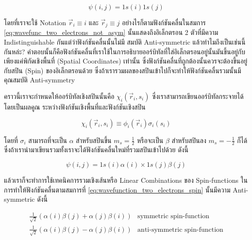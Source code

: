 \begin{equation}
    \label{eq:wavefunc_two_electrons_not_asym}
    \psi(i, j) = 1 s(i) 1 s(j)
\end{equation}

\noindent โดยที่เราจะใช้ Notation $\vec{r}_i \equiv i$ และ $\vec{r}_j \equiv j$ อย่างไรก็ตามฟังก์ชันคลื่นในสมการ
\eqref{eq:wavefunc_two_electrons_not_asym} นั้นแสดงถึงอิเล็กตรอน 2 ตัวที่มีความ Indistinguishable กันแต่ว่าฟังก์ชันคลื่นนั้นไม่มี%
สมบัติ Anti-symmetric แล้วทำไมถึงเป็นเช่นนี้กันหล่ะ? คำตอบนั้นก็คือฟังก์ชันคลื่นที่เราใช้ในการอธิบายออร์บิทัลที่ใส่อิเล็กตรอนอยู่นั้นมันขึ้นอยู่กับ%
เพียงแค่พิกัดเชิงพื้นที่ (Spatial Coordinates) เท่านั้น ซึ่งฟังก์ชันคลื่นที่ถูกต้องนั้นควรจะต้องขึ้นอยู่กับสปิน (Spin) ของอิเล็กตรอนด้วย%
ซึ่งถ้าเรารวมผลของสปินเข้าไปก็จะทำให้ฟังก์ชันคลื่นรวมนั้นมีคุณสมบัติ Anti-symmetry

คราวนี้เราจะกำหนดให้ออร์บิทัลเชิงสปินนั้นคือ $\chi_i\left(\vec{r}_i, s_i\right)$ ซึ่งเราสามารถเขียนออร์บิทัลกระจายได้โดยเป็นผลคูณ%
ระหว่างฟังก์ชันเชิงพื้นที่และฟังก์ชันเชิงสปิน

\begin{equation}
    \chi_i\left(\vec{r}_i, s_i\right)
    \equiv
    \phi_i\left(\vec{r}_i\right) \sigma_i\left(s_i\right)
\end{equation}

\noindent โดยที่ $\sigma_i$ สามารถที่จะเป็น $\alpha$ สำหรับสปินขึ้น $m_s=\frac{1}{2}$ หรือจะเป็น $\beta$ สำหรับสปินลง
$m_s=-\frac{1}{2}$ ก็ได้ ซึ่งถ้าเรานำมาเขียนรวมทั้งเราจะได้ฟังก์ชันคลื่นใหม่ที่รวมสปินเข้าไปด้วย ดังนี้

\begin{equation}
    \label{eq:wavefunction_two_electrons_spin}
    \psi(i, j)
    =
    1 s(i) \alpha(i) \times 1 s(j) \beta(j)
\end{equation}

\noindent แล้วเราก็จะทำการใช้เทคนิคการรวมเชิงเส้นหรือ Linear Combinations ของ Spin-functions ในการทำให้ฟังก์ชันคลื่นตามสมการที่
\eqref{eq:wavefunction_two_electrons_spin} นั้นมีความ Anti-symmetric ดังนี้

\begin{equation}
    \begin{array}{ll}
        \frac{1}{\sqrt{2}}(\alpha(i) \beta(j) + \alpha(j) \beta(i)) & \text{symmetric spin-function}      \\
        \frac{1}{\sqrt{2}}(\alpha(i) \beta(j) - \alpha(j) \beta(i)) & \text{anti-symmetric spin-function}
    \end{array}
\end{equation}

